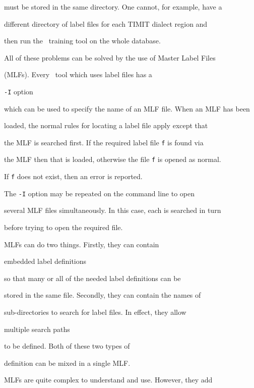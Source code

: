 must be stored in the same directory.  One cannot, for example, have a


different directory of label files for each TIMIT dialect region and


then run the \HTK\ training tool  on the whole database.





All of these problems can be solved by the use of Master Label Files


(MLFs).  Every \HTK\ tool which uses label files has a 


\texttt{-I} option


which can be used to specify the name of an MLF file.  When an MLF has been


loaded, the normal rules for locating a label file apply except that


the MLF is searched first.  If the required label file \texttt{f} is found via


the MLF then that is loaded, otherwise the file \texttt{f} is opened as normal.


If \texttt{f} does not exist, then an error is reported.


The \texttt{-I} option may be repeated on the command line to open


several MLF files simultaneously.  In this case, each is searched in turn


before trying to open the required file.





MLFs can do two things.  Firstly, they can contain 


embedded label definitions 


so that many or all of the needed label definitions can be


stored in the same file.  Secondly, they can contain the names of


sub-directories to search for label files.  In effect, they allow


multiple search paths 


to be defined.  Both of these two types of


definition can be mixed in a single MLF.





MLFs are quite complex to understand and use.  However, they add


